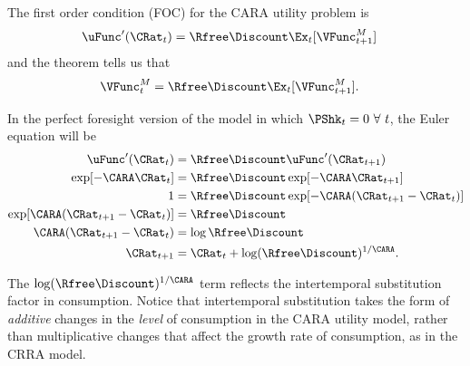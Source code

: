 \documentclass{handout}
\begin{document}
The first order condition (FOC) for the CARA utility problem is
\begin{equation}\begin{gathered}\begin{aligned}
        \uFunc^{\prime}(\CRat_{t}) & =  \Rfree \Discount \Ex_{t}[\VFunc_{t+1}^{M}]
\end{aligned}\end{gathered}\end{equation}
and the  theorem tells us that
\begin{equation}\begin{gathered}\begin{aligned}
        \VFunc^{M}_{t} & =  \Rfree \Discount \Ex_{t}[\VFunc_{t+1}^{M}].
\end{aligned}\end{gathered}\end{equation}

In the perfect foresight version of the model in
which $\PShk_{t} = 0 ~\forall~t$, the Euler equation will be
\begin{equation}\begin{gathered}\begin{aligned}
        \uFunc^{\prime}(\CRat_{t}) & =  \Rfree\Discount \uFunc^{\prime}(\CRat_{t+1}) \\
    \exp[-\CARA \CRat_{t}] & =  \Rfree \Discount \exp[-\CARA \CRat_{t+1}]
\\      1 & =  \Rfree\Discount \exp[-\CARA (\CRat_{t+1}-\CRat_{t})]
\\  \exp[\CARA (\CRat_{t+1}-\CRat_{t})] & =  \Rfree\Discount \label{eq:cgrow}
\\ \CARA (\CRat_{t+1}-\CRat_{t})  & =  \log \Rfree\Discount
\\  \CRat_{t+1} & =  \CRat_{t}+\log (\Rfree\Discount)^{1/\CARA}
.
\end{aligned}\end{gathered}\end{equation}

The $\log (\Rfree\Discount)^{1/\CARA}$ term reflects the intertemporal 
substitution factor in consumption.  Notice that intertemporal 
substitution takes the form of {\it additive} changes in the {\it 
level} of consumption in the CARA utility model, rather than 
multiplicative changes that affect the growth rate of consumption, as 
in the CRRA model.
\end{document}
